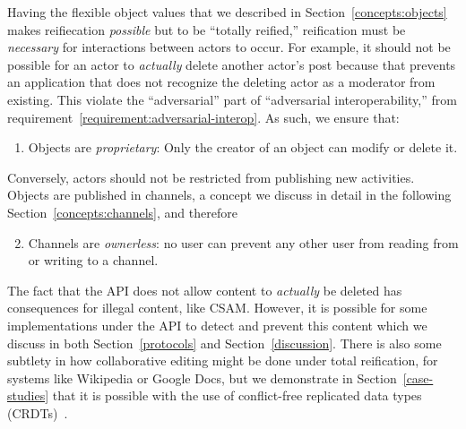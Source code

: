

Having the flexible object values that we described in Section~\ref{concepts:objects}
makes reifiecation \emph{possible} but to be ``totally reified,''
reification must be \emph{necessary} for interactions between
actors to occur.
For example, it should not be possible for an actor to \emph{actually}
delete another actor's post because that prevents
an application that does not recognize the deleting actor as a moderator from existing.
This violate the ``adversarial'' part of ``adversarial interoperability,''
from requirement~\ref{requirement:adversarial-interop}.
As such, we ensure that:
\begin{enumerate}
\item
Objects are \emph{proprietary}: Only the creator of an object can modify or delete it.
\end{enumerate}
Conversely, actors should not be restricted from publishing new
activities.
Objects are published in channels, a concept we discuss in detail
in the following Section~\ref{concepts:channels}, and therefore
\begin{enumerate}
\setcounter{enumi}{1}
\item
Channels are \emph{ownerless}: no user can prevent any other user from reading from or writing to a channel.
\end{enumerate}

The fact that the API does not allow content to \emph{actually} be deleted
has consequences for illegal content, like CSAM.
However, it is possible for some implementations under the API to detect
and prevent this content which we discuss in both
Section~\ref{protocols} and Section~\ref{discussion}.
There is also some subtlety in how collaborative editing might be done under total reification,
for systems like Wikipedia or Google Docs,
but we demonstrate in Section~\ref{case-studies} that
it is possible with the use of conflict-free replicated data types (CRDTs)~\cite{crdts}.

